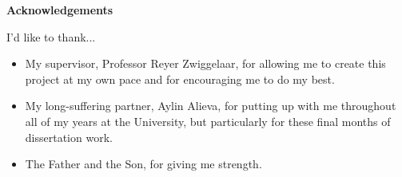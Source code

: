 \thispagestyle{empty}

\begin{center}
    {\LARGE\bf Acknowledgements}
\end{center}

I'd like to thank...
\begin{itemize}
	\item My supervisor, Professor Reyer Zwiggelaar, for allowing me to create this project at my own pace and for encouraging me to do my best.
	\item My long-suffering partner, Aylin Alieva, for putting up with me throughout all of my years at the University, but particularly for these final months of dissertation work. 
	\item The Father and the Son, for giving me strength.
\end{itemize}
